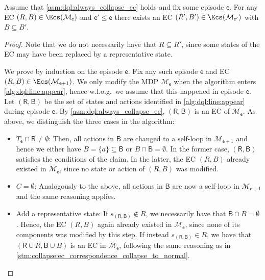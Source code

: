 \documentclass{article}
\newcommand{\unionSym}{\cup}
\newcommand{\unionBin}{\mathbin{\unionSym}}
\newcommand{\intersectionSym}{\cap}
\newcommand{\intersectionBin}{\mathbin{\intersectionSym}}
\newcommand{\union}{\unionBin}
\newcommand{\intersection}{\intersectionBin}
\newcommand{\MDP}{\mathcal{M}}
\newcommand{\targetset}{T}
\newcommand{\algoepisode}{\mathsf{e}}
\begin{document}
\begin{lemma} \label{stm:dql:ec_contained_in_previous}
	Assume that \cref{asm:dql:always_collapse_ec} holds and fix some episode $\algoepisode$.
	For any EC $(R, B) \in \Ecs(\MDP_\algoepisode)$ and $\algoepisode' \leq \algoepisode$ there exists an EC $(R', B') \in \Ecs(\MDP_{\algoepisode'})$ with $B \subseteq B'$.
\end{lemma}

\begin{proof}
	Note that we do not necessarily have that $R \subseteq R'$, since some states of the EC may have been replaced by a representative state.

	We prove by induction on the episode $\algoepisode$.
	Fix any such episode $\algoepisode$ and EC $(R, B) \in \Ecs(\MDP_{\algoepisode + 1})$.
	We only modify the MDP $\MDP_\algoepisode$ when the algorithm enters \cref{alg:dql:line:appear}, hence w.l.o.g.\ we assume that this happened in episode $\algoepisode$.
	Let $(\mathsf{R}, \mathsf{B})$ be the set of states and actions identified in \cref{alg:dql:line:appear} during episode $\algoepisode$.
	By \cref{asm:dql:always_collapse_ec}, $(\mathsf{R}, \mathsf{B})$ is an EC of $\MDP_\algoepisode$.
	As above, we distinguish the three cases in the algorithm:
	\begin{itemize}
		\item $\targetset_\algoepisode \intersection \mathsf{R} \neq \emptyset$:
			Then, all actions in $\mathsf{B}$ are changed to a self-loop in $\MDP_{\algoepisode + 1}$ and hence we either have $B = \{a\} \subseteq \mathsf{B}$ or $B \intersection \mathsf{B} = \emptyset$.
			In the former case, $(\mathsf{R}, \mathsf{B})$ satisfies the conditions of the claim.
			In the latter, the EC $(R, B)$ already existed in $\MDP_\algoepisode$, since no state or action of $(R, B)$ was modified.
		\item $C = \emptyset$:
			Analogously to the above, all actions in $\mathsf{B}$ are now a self-loop in $\MDP_{\algoepisode + 1}$ and the same reasoning applies.
		\item Add a representative state:
			If $s_{(\mathsf{R}, \mathsf{B})} \notin R$, we necessarily have that $\mathsf{B} \intersection B = \emptyset$.
			Hence, the EC $(R, B)$ again already existed in $\MDP_\algoepisode$, since none of its components was modified by this step.
			If instead $s_{(\mathsf{R}, \mathsf{B})} \in R$, we have that $(\mathsf{R} \union R, \mathsf{B} \union B)$ is an EC in $\MDP_\algoepisode$, following the same reasoning as in \cref{stm:collapse:ec_correspondence_collapse_to_normal}. \qedhere 
	\end{itemize}
\end{proof}
\end{document}
